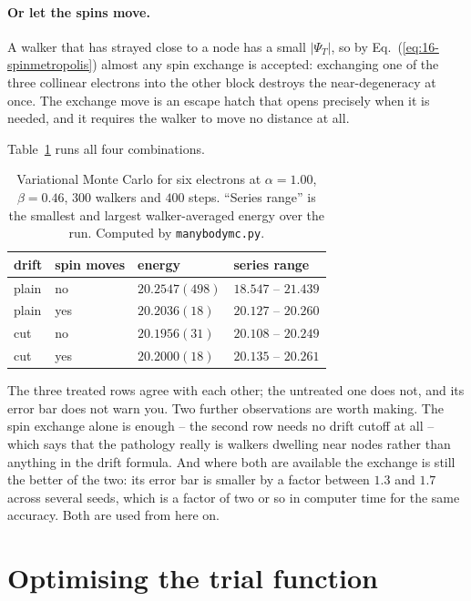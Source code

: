 \paragraph{Or let the spins move.}
A walker that has strayed close to a node has a small $|\Psi_T|$, so by
Eq.~(\ref{eq:16-spinmetropolis}) almost any spin exchange is accepted:
exchanging one of the three collinear electrons into the other block destroys
the near-degeneracy at once.  The exchange move is an escape hatch that opens
precisely when it is needed, and it requires the walker to move no distance at
all.

Table~\ref{tab:16-nodes} runs all four combinations.

\begin{table}[h]
\centering
\renewcommand{\arraystretch}{1.2}
\setlength{\tabcolsep}{11pt}
\begin{tabular}{llll}
\toprule
drift & spin moves & energy & series range\\
\midrule
plain & no  & $20.2547(498)$ & $18.547$ -- $21.439$\\
plain & yes & $20.2036(18)$  & $20.127$ -- $20.260$\\
cut   & no  & $20.1956(31)$  & $20.108$ -- $20.249$\\
cut   & yes & $20.2000(18)$  & $20.135$ -- $20.261$\\
\bottomrule
\end{tabular}
\caption{Variational Monte Carlo for six electrons at $\alpha=1.00$,
$\beta=0.46$, $300$ walkers and $400$ steps.  ``Series range'' is the smallest
and largest walker-averaged energy over the run.  Computed by
\texttt{manybodymc.py}.}
\label{tab:16-nodes}
\end{table}

The three treated rows agree with each other; the untreated one does not, and
its error bar does not warn you.  Two further observations are worth making.
The spin exchange alone is enough -- the second row needs no drift cutoff at
all -- which says that the pathology really is walkers dwelling near nodes
rather than anything in the drift formula.  And where both are available the
exchange is still the better of the two: its error bar is smaller by a factor
between $1.3$ and $1.7$ across several seeds, which is a factor of two or so in
computer time for the same accuracy.  Both are used from here on.

\section{Optimising the trial function}
\label{sec:appoptimise}

